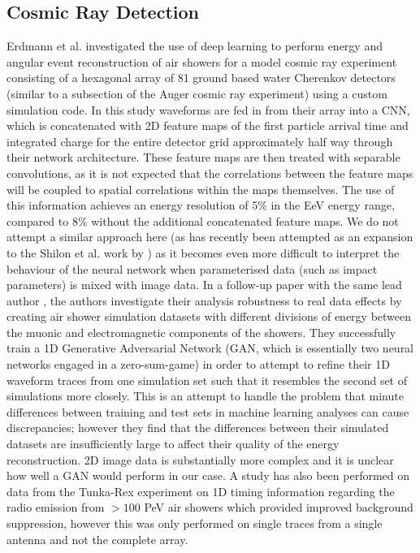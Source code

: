 \subsection{Cosmic Ray Detection}
Erdmann et al. \cite{aug1} investigated the use of deep learning to perform energy and angular event reconstruction of air showers for a model cosmic ray experiment consisting of a hexagonal array of 81 ground based water Cherenkov detectors (similar to a subsection of the Auger cosmic ray experiment) using a custom simulation code. In this study waveforms are fed in from their array into a CNN, which is concatenated with 2D feature maps of the first particle arrival time and integrated charge for the entire detector grid approximately half way through their network architecture. These feature maps are then treated with separable convolutions, as it is not expected that the correlations between the feature maps will be coupled to spatial correlations within the maps themselves. The use of this information achieves an energy resolution of 5\% in the EeV energy range, compared to 8\% without the additional concatenated feature maps. We do not attempt a similar approach here (as has recently been attempted as an expansion to the Shilon et al. work by \cite{ParsonsOhm}) as it becomes even more difficult to interpret the behaviour of the neural network when parameterised data (such as impact parameters) is mixed with image data. In a follow-up paper with the same lead author \cite{ErdmannAuger}, the authors investigate their analysis robustness to real data effects by creating air shower simulation datasets with different divisions of energy between the muonic and electromagnetic components of the showers. They successfully train a 1D Generative Adversarial Network (GAN, which is essentially two neural networks engaged in a zero-sum-game) in order to attempt to refine their 1D waveform traces from one simulation set such that it resembles the second set of simulations more closely. This is an attempt to handle the problem that minute differences between training and test sets in machine learning analyses can cause discrepancies; however they find that the differences between their simulated datasets are insufficiently large to affect their quality of the energy reconstruction. 2D image data is substantially more complex and it is unclear how well a GAN would perform in our case. A study has also been performed on data from the Tunka-Rex experiment \cite{tunka} on 1D timing information regarding the radio emission from $>100$ PeV air showers which provided improved background suppression, however this was only performed on single traces from a single antenna and not the complete array.

